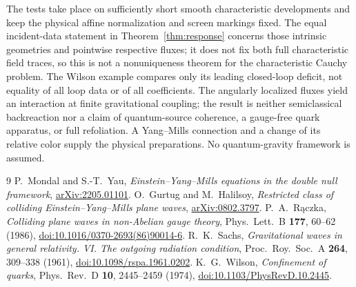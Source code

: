 \documentclass[11pt]{article}
\begin{document}
The tests take place on sufficiently short smooth characteristic developments and keep the physical affine normalization and screen markings fixed. The equal incident-data statement in Theorem~\ref{thm:response} concerns those intrinsic geometries and pointwise respective fluxes; it does not fix both full characteristic field traces, so this is not a nonuniqueness theorem for the characteristic Cauchy problem. The Wilson example compares only its leading closed-loop deficit, not equality of all loop data or of all coefficients. The angularly localized fluxes yield an interaction at finite gravitational coupling; the result is neither semiclassical backreaction nor a claim of quantum-source coherence, a gauge-free quark apparatus, or full refoliation. A Yang--Mills connection and a change of its relative color supply the physical preparations. No quantum-gravity framework is assumed.

\begin{thebibliography}{9}
 P.~Mondal and S.-T.~Yau, \emph{Einstein--Yang--Mills equations in the double null framework}, \href{https://arxiv.org/abs/2205.01101}{arXiv:2205.01101}.
 O.~Gurtug and M.~Halilsoy, \emph{Restricted class of colliding Einstein--Yang--Mills plane waves}, \href{https://arxiv.org/abs/0802.3797}{arXiv:0802.3797}.
 P.~A.~R\k{a}czka, \emph{Colliding plane waves in non-Abelian gauge theory}, Phys.\ Lett.\ B \textbf{177}, 60--62 (1986), \href{https://doi.org/10.1016/0370-2693(86)90014-6}{doi:10.1016/0370-2693(86)90014-6}.
 R.~K.~Sachs, \emph{Gravitational waves in general relativity. VI. The outgoing radiation condition}, Proc.\ Roy.\ Soc.\ A \textbf{264}, 309--338 (1961), \href{https://doi.org/10.1098/rspa.1961.0202}{doi:10.1098/rspa.1961.0202}.
 K.~G.~Wilson, \emph{Confinement of quarks}, Phys.\ Rev.\ D \textbf{10}, 2445--2459 (1974), \href{https://doi.org/10.1103/PhysRevD.10.2445}{doi:10.1103/PhysRevD.10.2445}.
\end{thebibliography}
\end{document}
